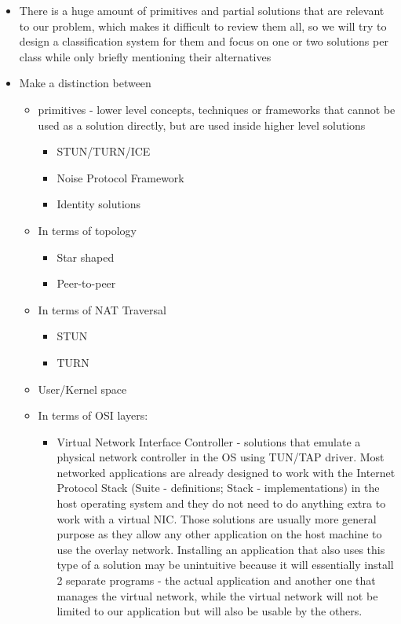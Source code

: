 \begin{itemize}
\item
  There is a huge amount of primitives and partial solutions that are
  relevant to our problem, which makes it difficult to review them all,
  so we will try to design a classification system for them and focus on
  one or two solutions per class while only briefly mentioning their
  alternatives
\item
  Make a distinction between

  \begin{itemize}
  \tightlist
  \item
    primitives - lower level concepts, techniques or frameworks that
    cannot be used as a solution directly, but are used inside higher
    level solutions

    \begin{itemize}
    \tightlist
    \item
      STUN/TURN/ICE
    \item
      Noise Protocol Framework
    \item
      Identity solutions
    \end{itemize}
  \item
    In terms of topology

    \begin{itemize}
    \tightlist
    \item
      Star shaped
    \item
      Peer-to-peer
    \end{itemize}
  \item
    In terms of NAT Traversal

    \begin{itemize}
    \tightlist
    \item
      STUN
    \item
      TURN
    \end{itemize}
  \item
    User/Kernel space
  \item
    In terms of OSI layers:

    \begin{itemize}
    \tightlist
    \item
      Virtual Network Interface Controller - solutions that emulate a
      physical network controller in the OS using TUN/TAP driver. Most
      networked applications are already designed to work with the
      Internet Protocol Stack (Suite - definitions; Stack -
      implementations) in the host operating system and they do not need
      to do anything extra to work with a virtual NIC. Those solutions
      are usually more general purpose as they allow any other
      application on the host machine to use the overlay network.
      Installing an application that also uses this type of a solution
      may be unintuitive because it will essentially install 2 separate
      programs - the actual application and another one that manages the
      virtual network, while the virtual network will not be limited to
      our application but will also be usable by the others.


\end{itemize}
\end{itemize}
\end{itemize}
